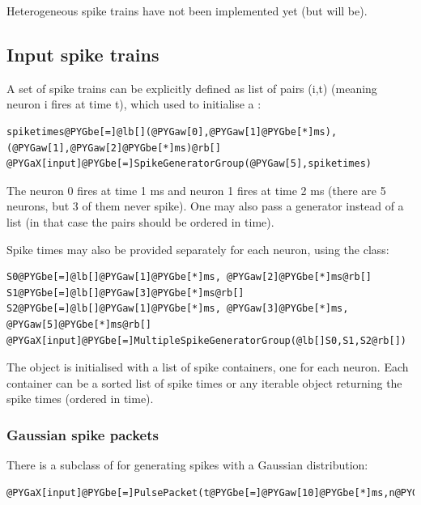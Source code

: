 \documentclass[letterpaper,10pt]{manual}
\begin{document}
Heterogeneous spike trains have not been implemented yet (but will be).


\subsection{Input spike trains}

A set of spike trains can be explicitly defined as list of pairs (i,t)
(meaning neuron i fires at time t), which used to initialise a
\hyperlink{brian.SpikeGeneratorGroup}{}:

\begin{Verbatim}[commandchars=@\[\]]
spiketimes@PYGbe[=]@lb[](@PYGaw[0],@PYGaw[1]@PYGbe[*]ms), (@PYGaw[1],@PYGaw[2]@PYGbe[*]ms)@rb[]
@PYGaX[input]@PYGbe[=]SpikeGeneratorGroup(@PYGaw[5],spiketimes)
\end{Verbatim}

The neuron 0 fires at time 1 ms and neuron 1 fires at time 2 ms (there are 5 neurons,
but 3 of them never spike).
One may also pass a generator instead of a list (in that case the pairs should be
ordered in time).

Spike times may also be provided separately for each neuron, using the
\hyperlink{brian.MultipleSpikeGeneratorGroup}{} class:

\begin{Verbatim}[commandchars=@\[\]]
S0@PYGbe[=]@lb[]@PYGaw[1]@PYGbe[*]ms, @PYGaw[2]@PYGbe[*]ms@rb[]
S1@PYGbe[=]@lb[]@PYGaw[3]@PYGbe[*]ms@rb[]
S2@PYGbe[=]@lb[]@PYGaw[1]@PYGbe[*]ms, @PYGaw[3]@PYGbe[*]ms, @PYGaw[5]@PYGbe[*]ms@rb[]
@PYGaX[input]@PYGbe[=]MultipleSpikeGeneratorGroup(@lb[]S0,S1,S2@rb[])
\end{Verbatim}

The object is initialised with a list of spike containers, one for each neuron.
Each container can be a sorted list of spike times or any iterable object returning
the spike times (ordered in time).


\subsubsection{Gaussian spike packets}

There is a subclass of \hyperlink{brian.SpikeGeneratorGroup}{} for generating spikes with a Gaussian
distribution:

\begin{Verbatim}[commandchars=@\[\]]
@PYGaX[input]@PYGbe[=]PulsePacket(t@PYGbe[=]@PYGaw[10]@PYGbe[*]ms,n@PYGbe[=]@PYGaw[10],sigma@PYGbe[=]@PYGaw[3]@PYGbe[*]ms)
\end{Verbatim}
\end{document}
